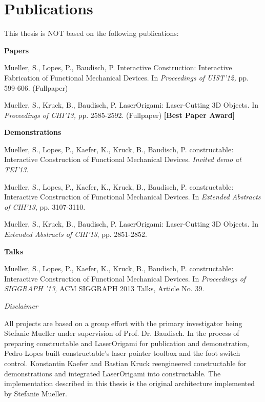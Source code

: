 \chapter*{Publications}
This thesis is NOT based on the following publications:

\bigskip
\bigskip

\noindent \textbf{Papers}

\bigskip

\noindent Mueller, S., Lopes, P., Baudisch, P. Interactive Construction: Interactive Fabrication of Functional Mechanical Devices. In  \textit{Proceedings of UIST'12,} pp. 599-606. (Fullpaper) 
\bigskip

\noindent Mueller, S., Kruck, B., Baudisch, P. LaserOrigami: Laser-Cutting 3D Objects. In \textit{Proceedings of CHI'13,} pp. 2585-2592. (Fullpaper) \newline \textbf{[Best Paper Award]} 

\bigskip
\bigskip

\noindent \textbf{Demonstrations}

\bigskip

\noindent Mueller, S., Lopes, P., Kaefer, K., Kruck, B., Baudisch, P. constructable: Interactive Construction of Functional Mechanical Devices. \textit{Invited demo at TEI'13}. 
\bigskip

\noindent Mueller, S., Lopes, P., Kaefer, K., Kruck, B., Baudisch, P. constructable: Interactive Construction of Functional Mechanical Devices. In \textit{Extended Abstracts of CHI'13}, pp. 3107-3110. 
\bigskip

\noindent Mueller, S., Kruck, B., Baudisch, P. LaserOrigami: Laser-Cutting 3D Objects. In \textit{Extended Abstracts of CHI'13}, pp. 2851-2852. 
\bigskip
\bigskip

\noindent \textbf{Talks}

\bigskip
\noindent Mueller, S., Lopes, P., Kaefer, K., Kruck, B., Baudisch, P. constructable: Interactive Construction of Functional Mechanical Devices. In \textit{Proceedings of SIGGRAPH '13,} ACM SIGGRAPH 2013 Talks,
Article No. 39.  


\bigskip
\bigskip
\bigskip
\noindent \textit{Disclaimer}

\noindent All projects are based on a group effort with the primary investigator being Stefanie Mueller under supervision of Prof. Dr. Baudisch. In the process of preparing constructable and LaserOrigami for publication and demonstration, Pedro Lopes built constructable's laser pointer toolbox and the foot switch control. Konstantin Kaefer and Bastian Kruck reengineered constructable for demonstrations and integrated LaserOrigami into constructable. The implementation described in this thesis is the original architecture implemented by Stefanie Mueller.

